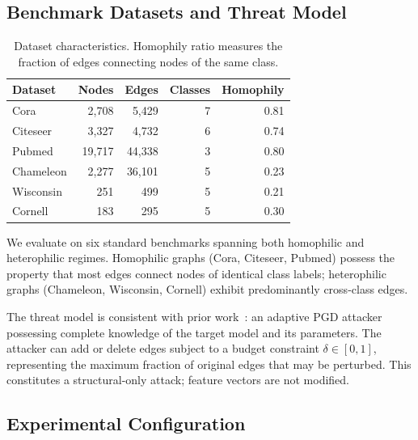 \documentclass[sigconf]{acmart}
\begin{document}
\subsection{Benchmark Datasets and Threat Model}
\begin{table}[!ht]
  \centering
  \small
  \caption{Dataset characteristics. Homophily ratio measures the fraction of edges connecting nodes of the same class.}
  \label{tab:dataset-stats}
  \begin{tabular}{lrrrr}
    \toprule
    Dataset & Nodes & Edges & Classes & Homophily \\
    \midrule
    Cora      & 2,708  & 5,429  & 7 & 0.81 \\
    Citeseer  & 3,327  & 4,732  & 6 & 0.74 \\
    Pubmed    & 19,717 & 44,338 & 3 & 0.80 \\
    Chameleon & 2,277  & 36,101 & 5 & 0.23 \\
    Wisconsin & 251    & 499    & 5 & 0.21 \\
    Cornell   & 183    & 295    & 5 & 0.30 \\
    \bottomrule
  \end{tabular}
\end{table}

We evaluate on six standard benchmarks spanning both homophilic and heterophilic regimes. Homophilic graphs (Cora, Citeseer, Pubmed) possess the property that most edges connect nodes of identical class labels; heterophilic graphs (Chameleon, Wisconsin, Cornell) exhibit predominantly cross-class edges.

The threat model is consistent with prior work~\cite{hou2024rung}: an adaptive PGD attacker possessing complete knowledge of the target model and its parameters. The attacker can add or delete edges subject to a budget constraint $\delta \in [0, 1]$, representing the maximum fraction of original edges that may be perturbed. This constitutes a structural-only attack; feature vectors are not modified.

\subsection{Experimental Configuration}
\end{document}
